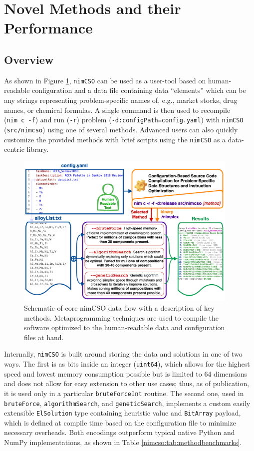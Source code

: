 \section{Novel Methods and their Performance} \label{nimcso:sec:methods}

\subsection{Overview} \label{nimcso:sec:methodsoverview}

As shown in Figure \ref{nimcso:fig:main}, \texttt{nimCSO} can be used as a
user-tool based on human-readable configuration and a data file
containing data ``elements'' which can be any strings representing
problem-specific names of, e.g., market stocks, drug names, or chemical
formulas. A single command is then used to recompile
(\texttt{nim\ c\ -f}) and run (\texttt{-r}) problem
(\texttt{-d:configPath=config.yaml}) with \texttt{nimCSO}
(\texttt{src/nimcso}) using one of several methods. Advanced users can
also quickly customize the provided methods with brief scripts using the
\texttt{nimCSO} as a data-centric library.

\begin{figure}[H]
\centering
\includegraphics[width=0.95\textwidth]{nimcso/nimCSO_mainFigure.png}
\caption{Schematic of core nimCSO data flow with a description of key
methods. Metaprogramming techniques are used to compile the software optimized to
the human-readable data and configuration files at hand.}
\label{nimcso:fig:main}
\end{figure}

Internally, \texttt{nimCSO} is built around storing the data and
solutions in one of two ways. The first is as bits inside an integer
(\texttt{uint64}), which allows for the highest speed and lowest memory
consumption possible but is limited to 64 dimensions and does not allow
for easy extension to other use cases; thus, as of publication, it is
used only in a particular \texttt{bruteForceInt} routine. The second
one, used in \texttt{bruteForce}, \texttt{algorithmSearch}, and
\texttt{geneticSearch}, implements a custom easily extensible
\texttt{ElSolution} type containing heuristic value and
\texttt{BitArray} payload, which is defined at compile time based on the
configuration file to minimize necessary overheads. Both encodings
outperform typical native Python and NumPy implementations, as shown in
Table \ref{nimcso:tab:methodbenchmarks}.

